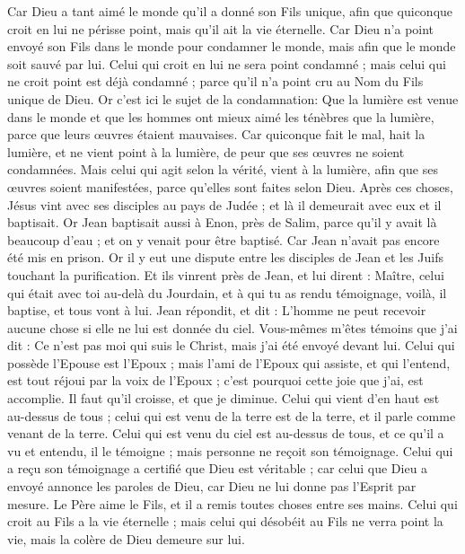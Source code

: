 \begin{multicols}{2}
Car Dieu a tant aimé le monde qu'il a donné son Fils unique, afin que quiconque croit en lui ne périsse point, mais qu'il ait la vie éternelle.
Car Dieu n'a point envoyé son Fils dans le monde pour condamner le monde, mais afin que le monde soit sauvé par lui.
Celui qui croit en lui ne sera point condamné ; mais celui qui ne croit point est déjà condamné ; parce qu'il n'a point cru au Nom du Fils unique de Dieu.
Or c'est ici le sujet de la condamnation: Que la lumière est venue dans le monde et que les hommes ont mieux aimé les ténèbres que la lumière, parce que leurs œuvres étaient mauvaises.
Car quiconque fait le mal, hait la lumière, et ne vient point à la lumière, de peur que ses œuvres ne soient condamnées.
Mais celui qui agit selon la vérité, vient à la lumière, afin que ses œuvres soient manifestées, parce qu'elles sont faites selon Dieu.
Après ces choses, Jésus vint avec ses disciples au pays de Judée ; et là il demeurait avec eux et il baptisait.
Or Jean baptisait aussi à Enon, près de Salim, parce qu'il y avait là beaucoup d'eau ; et on y venait pour être baptisé.
Car Jean n'avait pas encore été mis en prison.
Or il y eut une dispute entre les disciples de Jean et les Juifs touchant la purification.
Et ils vinrent près de Jean, et lui dirent : Maître, celui qui était avec toi au-delà du Jourdain, et à qui tu as rendu témoignage, voilà, il baptise, et tous vont à lui.
Jean répondit, et dit : L'homme ne peut recevoir aucune chose si elle ne lui est donnée du ciel.
Vous-mêmes m'êtes témoins que j'ai dit : Ce n'est pas moi qui suis le Christ, mais j'ai été envoyé devant lui.
Celui qui possède l'Epouse est l'Epoux ; mais l'ami de l'Epoux qui assiste, et qui l'entend, est tout réjoui par la voix de l'Epoux ; c'est pourquoi cette joie que j'ai, est accomplie.
Il faut qu'il croisse, et que je diminue.
Celui qui vient d'en haut est au-dessus de tous ; celui qui est venu de la terre est de la terre, et il parle comme venant de la terre. Celui qui est venu du ciel est au-dessus de tous,
et ce qu'il a vu et entendu, il le témoigne ; mais personne ne reçoit son témoignage.
Celui qui a reçu son témoignage a certifié que Dieu est véritable ;
car celui que Dieu a envoyé annonce les paroles de Dieu, car Dieu ne lui donne pas l'Esprit par mesure.
Le Père aime le Fils, et il a remis toutes choses entre ses mains.
Celui qui croit au Fils a la vie éternelle ; mais celui qui désobéit au Fils ne verra point la vie, mais la colère de Dieu demeure sur lui.

\end{multicols}

